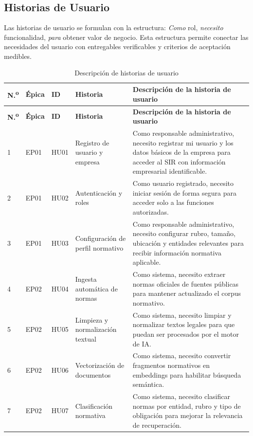 \documentclass[12pt,a4paper,oneside]{report}
\begin{document}
\subsection{Historias de Usuario}\label{subsec:historias-de-usuario}

Las historias de usuario se formulan con la estructura: \textit{Como} rol, \textit{necesito} funcionalidad, \textit{para} obtener valor de negocio. Esta estructura permite conectar las necesidades del usuario con entregables verificables y criterios de aceptación medibles.

\begin{longtable}{p{}p{}p{}p{}p{}}
\caption{Descripción de historias de usuario}\label{tab:cap3-historias-usuario}\\
\toprule
\textbf{N.\textsuperscript{o}} & \textbf{Épica} & \textbf{ID} & \textbf{Historia} & \textbf{Descripción de la historia de usuario} \\
\midrule
\endfirsthead
\toprule
\textbf{N.\textsuperscript{o}} & \textbf{Épica} & \textbf{ID} & \textbf{Historia} & \textbf{Descripción de la historia de usuario} \\
\midrule
\endhead
1 & EP01 & HU01 & Registro de usuario y empresa & Como responsable administrativo, necesito registrar mi usuario y los datos básicos de la empresa para acceder al SIR con información empresarial identificable. \\
2 & EP01 & HU02 & Autenticación y roles & Como usuario registrado, necesito iniciar sesión de forma segura para acceder solo a las funciones autorizadas. \\
3 & EP01 & HU03 & Configuración de perfil normativo & Como responsable administrativo, necesito configurar rubro, tamaño, ubicación y entidades relevantes para recibir información normativa aplicable. \\
4 & EP02 & HU04 & Ingesta automática de normas & Como sistema, necesito extraer normas oficiales de fuentes públicas para mantener actualizado el corpus normativo. \\
5 & EP02 & HU05 & Limpieza y normalización textual & Como sistema, necesito limpiar y normalizar textos legales para que puedan ser procesados por el motor de IA. \\
6 & EP02 & HU06 & Vectorización de documentos & Como sistema, necesito convertir fragmentos normativos en embeddings para habilitar búsqueda semántica. \\
7 & EP02 & HU07 & Clasificación normativa & Como sistema, necesito clasificar normas por entidad, rubro y tipo de obligación para mejorar la relevancia de recuperación. \\

\end{longtable}
\end{document}

